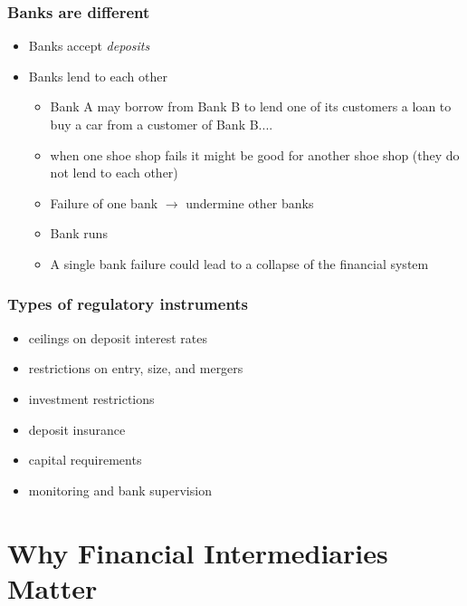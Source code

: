 \documentclass[11pt]{beamer}
\begin{document}
\begin{frame}
\frametitle{Banks are different}
\begin{itemize}
\item Banks accept \textit{deposits}
\item Banks lend to each other
\begin{itemize}
\item Bank A may borrow from Bank B to lend one of its customers a loan to
buy a car from a customer of Bank B.... \\
\item when one shoe shop fails it might be good for another shoe shop (they do not lend to each other)
\item Failure of one bank $\rightarrow$ undermine other banks
\item Bank runs
\item A single bank failure could lead to a collapse of the financial system
\end{itemize}
\end{itemize}
\end{frame}




\begin{frame}
\frametitle{Types of regulatory instruments}
\begin{itemize}
\item ceilings on deposit interest rates
\item restrictions on entry, size, and mergers
\item investment restrictions
\item deposit insurance
\item capital requirements
\item monitoring and bank supervision
\end{itemize}
\end{frame}



\section{Why Financial Intermediaries Matter}
%
\end{document}
